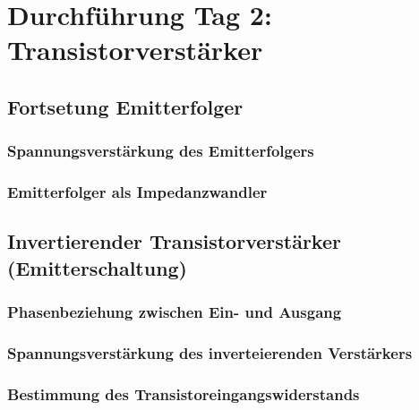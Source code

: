 
\fehlt


\FloatBarrier
\section{Durchführung Tag 2: Transistorverstärker}

\subsection{Fortsetung Emitterfolger}

\subsubsection{Spannungsverstärkung des Emitterfolgers}

\fehlt

\subsubsection{Emitterfolger als Impedanzwandler}

\fehlt

\subsection{Invertierender Transistorverstärker (Emitterschaltung)}

\subsubsection{Phasenbeziehung zwischen Ein- und Ausgang}

\fehlt

\subsubsection{Spannungsverstärkung des inverteierenden Verstärkers}

\fehlt

\subsubsection{Bestimmung des Transistoreingangswiderstands}

